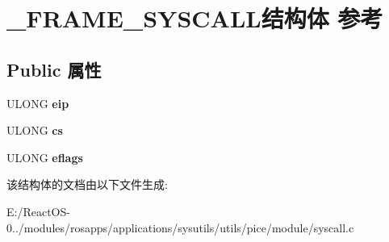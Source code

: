 \hypertarget{struct___f_r_a_m_e___s_y_s_c_a_l_l}{}\section{\+\_\+\+F\+R\+A\+M\+E\+\_\+\+S\+Y\+S\+C\+A\+L\+L结构体 参考}
\label{struct___f_r_a_m_e___s_y_s_c_a_l_l}
\subsection*{Public 属性}
\begin{DoxyCompactItemize}
\item 
\mbox{\label{struct___f_r_a_m_e___s_y_s_c_a_l_l_a5dd90349b084238836142ae741c0a031}} 
U\+L\+O\+NG {\bfseries eip}
\item 
\mbox{\label{struct___f_r_a_m_e___s_y_s_c_a_l_l_a5c44ba3af6176770f76d06ff57805772}} 
U\+L\+O\+NG {\bfseries cs}
\item 
\mbox{\label{struct___f_r_a_m_e___s_y_s_c_a_l_l_ad45c4a708225f1214ea15d0787f98ca2}} 
U\+L\+O\+NG {\bfseries eflags}
\end{DoxyCompactItemize}


该结构体的文档由以下文件生成\+:\begin{DoxyCompactItemize}
\item 
E\+:/\+React\+O\+S-\/0../modules/rosapps/applications/sysutils/utils/pice/module/syscall.\+c\end{DoxyCompactItemize}
